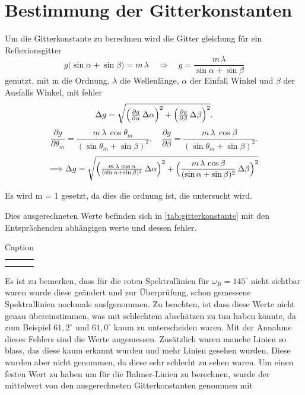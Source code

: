 \section{Bestimmung der Gitterkonstanten}
Um die Gitterkonstante zu berechnen wird die Gitter gleichung für ein Reflexionsgitter 
\begin{equation}
  g\bigl(\sin\alpha + \sin\beta\bigr) = m\,\lambda
  \quad\Longrightarrow\quad
  g = \frac{m\,\lambda}{\sin\alpha + \sin\beta}
  \label{Gittergleichung}
\end{equation}
genutzt, mit m die Ordnung, $\lambda$ die Wellenlänge, $\alpha$ der Einfall Winkel und $\beta$ der Ausfalls Winkel, mit fehler
\begin{equation}
  \Delta g
  = \sqrt{
    \Bigl(\tfrac{\partial g}{\partial\alpha}\,\Delta\alpha\Bigr)^{2}
   +\Bigl(\tfrac{\partial g}{\partial\beta}\,\Delta\beta\Bigr)^{2}
  }.
  \label{Gitterfgleichung fehler}
\end{equation}
\begin{equation}
  \frac{\partial g}{\partial\theta_m}
  = \frac{m\,\lambda\,\cos\theta_m}{(\sin\theta_m + \sin\beta)^{2}},
  \quad
  \frac{\partial g}{\partial\beta}
  = \frac{m\,\lambda\,\cos\beta}{(\sin\theta_m + \sin\beta)^{2}}.
\end{equation}
\begin{equation}
    \Longrightarrow \Delta g = \sqrt{\Bigl(\tfrac{m\,\lambda\,\cos{\alpha}}{(\sin{\alpha}+\sin{\beta})^2}\,\Delta\alpha\Bigr)^2 + \Bigl(\frac{m\,\lambda\,\cos{\beta}}{(\sin{\alpha} + \sin{\beta})^2}\,\Delta\beta\Bigr)^2}
\end{equation}

Es wird m = 1 gesetzt, da dies die ordnung ist, die untersucht wird.


Dies ausgerechneten Werte befinden sich in \cref{tab:gitterkonstante} mit den Entsprächenden abhängigen werte und dessen fehler.
\begin{table}[htbp]
    \centering
    \begin{tabular}{c|c}
         &  \\
         & 
    \end{tabular}
    \caption{Caption}
    \label{tab:my_label}
\end{table}
Es ist zu bemerken, dass für die roten Spektrallinien für $\omega_B = 145^\circ$ nicht sichtbar waren wurde diese geändert und zur Überprüfung, schon gemessene Spektrallinien nochmals ausfgenommen. 
Zu beachten, ist dass diese Werte nicht genau übereinstimmen, was mit schlechtem abschätzen zu tun haben könnte, da zum Beispiel $61,2^\circ$ und $61,0^\circ$ kaum zu unterscheiden waren.
Mit der Annahme dieses Fehlers sind die Werte angemessen.
Zusätzlich waren manche Linien so blass, das diese kaum erkannt wurden und mehr Linien gesehen wurden. 
Diese wurden aber nicht genommen, da diese sehr schlecht zu sehen waren. 
Um einen festen Wert zu haben um für die Balmer-Linien zu berechnen, wurde der mittelwert von den ausgerechneten Gitterkonstanten genommen mit 

